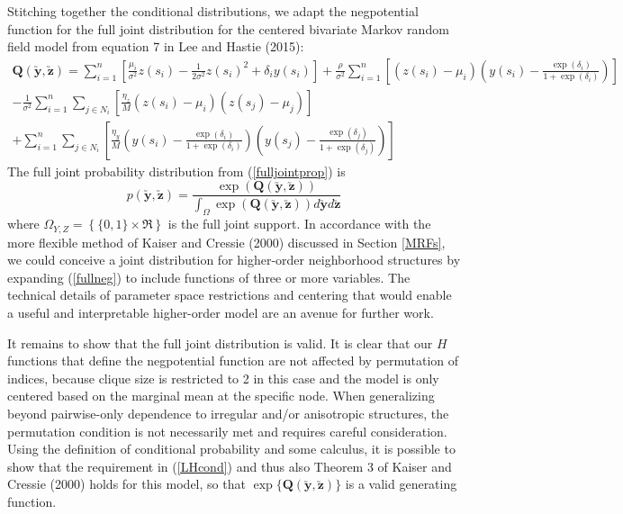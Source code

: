 \documentclass[12pt, a4paper, twoside]{article}
\begin{document}
Stitching together the conditional distributions, we adapt the negpotential function for the full joint distribution for the centered bivariate Markov random field model from equation 7 in Lee and Hastie (2015):
\begin{multline} \label{fullneg}
\boldsymbol{Q(\utilde{y},\utilde{z})} = \sum_{i = 1}^{n} \left[\frac{\mu_i}{\sigma^2}z(s_i) - \frac{1}{2\sigma^2}z(s_i)^2 + \delta_i y(s_i)\right] +  \frac{\rho}{\sigma^2} \sum_{i = 1}^{n} \left[\left(z(s_i)-\mu_i\right)\left(y(s_i) - \frac{\exp{(\delta_i)}}{1+\exp{(\delta_i)}}\right)\right]\\
-\frac{1}{\sigma^2}\sum_{i=1}^{n}\sum_{j\in N_i}\left[ \frac{\eta_z}{M}\left( z(s_i)-\mu_i\right)\left(z(s_j)-\mu_j \right)\right]\\
 + \sum_{i=1}^{n}\sum_{j\in N_i}\left[\frac{\eta_y}{M}\left(y(s_i) - \frac{\exp{(\delta_i)}}{1+\exp{(\delta_i)}}\right) \left(y(s_j) - \frac{\exp{(\delta_j)}}{1+\exp{(\delta_j)}}\right)\right]
\end{multline}
The full joint probability distribution from (\ref{fulljointprop}) is
\begin{equation} \label{jointNeg}
p(\boldsymbol{\utilde{y},\utilde{z}}) = \frac{\exp(\boldsymbol{Q(\utilde{y},\utilde{z})})}{\int_{\Omega}\exp(\boldsymbol{Q(\utilde{y},\utilde{z})})d\boldsymbol{\utilde{y}}d\boldsymbol{\utilde{z}}}
\end{equation}
where $\Omega_{Y,Z} = \left\lbrace \lbrace0,1\rbrace \times \Re \right\rbrace$ is the full joint support. In accordance with the more flexible method of Kaiser and Cressie (2000) discussed in Section \ref{MRFs}, we could conceive a joint distribution for higher-order neighborhood structures by expanding (\ref{fullneg}) to include functions of three or more variables. The technical details of parameter space restrictions and centering that would enable a useful and interpretable higher-order model are an avenue for further work.

It remains to show that the full joint distribution is valid. It is clear that our $H$ functions that define the negpotential function are not affected by permutation of indices, because clique size is restricted to 2 in this case and the model is only centered based on the marginal mean at the specific node. When generalizing beyond pairwise-only dependence to irregular and/or anisotropic structures, the permutation condition is not necessarily met and requires careful consideration. Using the definition of conditional probability and some calculus, it is possible to show that the requirement in (\ref{LHcond}) and thus also Theorem 3 of Kaiser and Cressie (2000) holds for this model, so that $\exp\lbrace \boldsymbol{Q(\utilde{y},\utilde{z})}\rbrace$ is a valid generating function.
\end{document}

